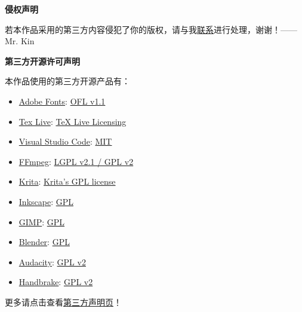 \begin{center}
    {\bfseries\sffamily\Large 侵权声明}
\end{center}

若本作品采用的第三方内容侵犯了你的版权，请与我\hyperlink{contact}{联系}进行处理，谢谢！——Mr. Kin

\begin{center}
    {\bfseries\sffamily\Large 第三方开源许可声明}
\end{center}

\noindent 本作品使用的第三方开源产品有：
\begin{multicols}{2}
\begin{itemize}
    \item \href{https://github.com/adobe-fonts}{Adobe Fonts}: \href{http://scripts.sil.org/cms/scripts/page.php?site_id=nrsi&id=OFL}{OFL v1.1}
    \item \href{https://tug.org/texlive/}{Tex Live}: \href{https://tug.org/texlive/copying.html}{TeX Live Licensing}
    \item \href{https://code.visualstudio.com/}{Visual Studio Code}: \href{https://www.mit-license.org/}{MIT}
    \item \href{http://ffmpeg.org/}{FFmpeg}: \href{http://ffmpeg.org/legal.html}{LGPL v2.1 / GPL v2}
    \item \href{https://krita.org/en/}{Krita}: \href{https://docs.krita.org/en/KritaFAQ.html?highlight=license#license-rights-and-the-krita-foundation}{Krita's GPL license}
    \item \href{https://inkscape.org/}{Inkscape}: \href{https://inkscape.org/about/license/}{GPL}
    \item \href{https://www.gimp.org}{GIMP}: \href{https://www.gimp.org/about/COPYING}{GPL}
    \item \href{https://www.blender.org}{Blender}: \href{https://www.blender.org/about/license/}{GPL}
    \item \href{https://www.audacityteam.org/}{Audacity}: \href{https://www.gnu.org/licenses/old-licenses/gpl-2.0.en.html}{GPL v2}
    \item \href{https://handbrake.fr}{Handbrake}: \href{https://github.com/HandBrake/HandBrake/blob/master/LICENSE}{GPL v2}
\end{itemize}
\end{multicols}

\noindent 更多请点击查看\href{https://mister-kin.github.io/about/third-party-declaration/}{第三方声明页}！
